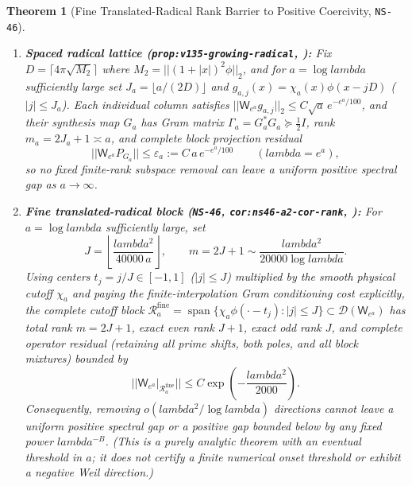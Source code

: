\documentclass[11pt]{article}
\def\lambda{lambda}%
\def\norm#1{||#1||}%
\newtheorem{theorem}{Theorem}[section]
\theoremstyle{remark}
\newcommand{\norm}[1]{\left\lVert #1\right\rVert}
\begin{document}
\begin{theorem}[Fine Translated-Radical Rank Barrier to Positive Coercivity, \texttt{NS-46}]
\label{thm:rank-barrier}
\leavevmode
\begin{enumerate}[label=(\alph*)]
  \item \textbf{Spaced radical lattice (\texttt{prop:v135-\allowbreak growing-\allowbreak radical}, ):} Fix $D = \lceil 4\pi\sqrt{M_2}\rceil$ where $M_2 = \norm{(1+|x|)^2\phi}_2$, and for $a = \log\lambda$ sufficiently large set $J_a = \lfloor a/(2D)\rfloor$ and $g_{a,j}(x) = \chi_a(x)\phi(x - jD)$ ($|j| \le J_a$). Each individual column satisfies $\norm{\mathsf{W}_{e^a}g_{a,j}}_2 \le C\sqrt{a}\,e^{-e^a/100}$, and their synthesis map $G_a$ has Gram matrix $\Gamma_a = G_a^* G_a \succeq \tfrac{1}{2}I$, rank $m_a = 2J_a + 1 \asymp a$, and complete block projection residual
  \begin{equation}\label{eq:v135-block-residual}
    \norm{\mathsf{W}_{e^a} P_{G_a}} \le \varepsilon_a := C\,a\,e^{-e^a/100} \qquad (\lambda = e^a),
  \end{equation}
  so no fixed finite-rank subspace removal can leave a uniform positive spectral gap as $a \to \infty$.
  \item \textbf{Fine translated-radical block (\texttt{NS-46}, \texttt{cor:ns46-\allowbreak a2-\allowbreak cor-\allowbreak rank}, ):} For $a = \log\lambda$ sufficiently large, set
  \begin{equation}
    J = \left\lfloor \frac{\lambda^2}{40000\,a} \right\rfloor, \qquad m = 2J + 1 \sim \frac{\lambda^2}{20000\log\lambda}.
  \end{equation}
  Using centers $t_j = j/J \in [-1,1]$ ($|j| \le J$) multiplied by the smooth physical cutoff $\chi_a$ and paying the finite-interpolation Gram conditioning cost explicitly, the complete cutoff block $\mathcal{R}_a^{\mathrm{fine}} = \operatorname{span}\{\chi_a\phi(\cdot - t_j) : |j| \le J\} \subset \mathcal{D}(\mathsf{W}_{e^a})$ has total rank $m = 2J + 1$, exact even rank $J + 1$, exact odd rank $J$, and complete operator residual (retaining all prime shifts, both poles, and all block mixtures) bounded by
  \begin{equation}\label{eq:ns46-fine-residual}
    \norm{\mathsf{W}_{e^a}\big|_{\mathcal{R}_a^{\mathrm{fine}}}} \le C\exp\!\left(-\frac{\lambda^2}{2000}\right).
  \end{equation}
  Consequently, removing $o(\lambda^2/\log\lambda)$ directions cannot leave a uniform positive spectral gap or a positive gap bounded below by any fixed power $\lambda^{-B}$. (This is a purely analytic theorem with an eventual threshold in $a$; it does not certify a finite numerical onset threshold or exhibit a negative Weil direction.)
\end{enumerate}
\end{theorem}
\end{document}
